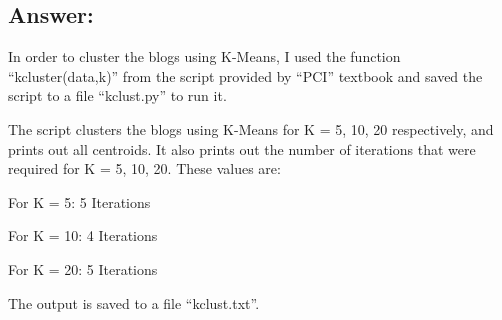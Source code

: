 \documentclass[a4paper, 11pt]{article}
\begin{document}
\subsection*{Answer:}
In order to cluster the blogs using K-Means, I used the function ``kcluster(data,k)'' from the script provided by ``PCI'' textbook and saved the script to a file ``kclust.py'' to run it. 



The script clusters the blogs using K-Means for K = 5, 10, 20 respectively, and prints out all centroids. It also prints out the number of iterations that were required for K = 5, 10, 20. These values are:

For K = 5: 5 Iterations

For K = 10: 4 Iterations

For K = 20: 5 Iterations

The output is saved to a file ``kclust.txt''.
\end{document}
